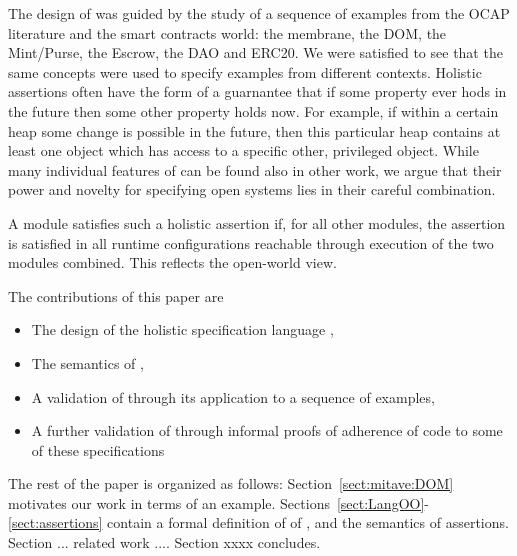 The design of \Chainmail was guided by the study of a sequence of examples from the OCAP literature and the 
smart contracts world: the membrane, the DOM, the Mint/Purse, the Escrow, the DAO and ERC20. 
We were satisfied to see that the same concepts were used to specify examples from  different contexts.
Holistic assertions often have the form of a guarnantee
 that if some property ever hods in the future then some other property holds now.
For example, if within a certain heap some change is possible in the future, then this particular heap contains 
at least one object which has access to a specific other, privileged object.
%
While many individual features of \Chainmail can be found also in other work, 
we argue that their power and novelty for specifying open systems lies in their careful combination.
 
A module satisfies such a holistic assertion if, for all other modules,
  the assertion is satisfied  in all runtime configurations reachable through execution of the two modules combined.
  This reflects the open-world view.
  
The contributions of this paper are
\begin{itemize}
\item The design of the holistic specification language \Chainmail,
\item The semantics of \Chainmail,
\item A validation of \Chainmail through its application to a sequence of examples,
\item A further validation of \Chainmail through informal proofs of adherence of code to some of these specifications
\end{itemize}  
  
  
The rest of the paper is organized as follows: Section~\ref{sect:mitave:DOM} 
motivates our work in terms of an example. Sections~\ref{sect:LangOO}-\ref{sect:assertions} contain a formal definition of of \LangOO, and the semantics of assertions. Section ... related work .... Section xxxx concludes.

